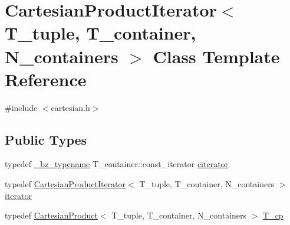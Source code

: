 \hypertarget{classCartesianProductIterator}{}\section{Cartesian\+Product\+Iterator$<$ T\+\_\+tuple, T\+\_\+container, N\+\_\+containers $>$ Class Template Reference}
\label{classCartesianProductIterator}


{\ttfamily \#include $<$cartesian.\+h$>$}

\subsection*{Public Types}
\begin{DoxyCompactItemize}
\item 
typedef \hyperlink{compiler_8h_a1bc40add3e72effc9cf69dbe445cbdfd}{\+\_\+bz\+\_\+typename} T\+\_\+container\+::const\+\_\+iterator \hyperlink{classCartesianProductIterator_a8cfe16c0d4694b851a0084e1c309c896}{citerator}
\item 
typedef \hyperlink{classCartesianProductIterator}{Cartesian\+Product\+Iterator}$<$ T\+\_\+tuple, T\+\_\+container, N\+\_\+containers $>$ \hyperlink{classCartesianProductIterator_a68eb421dce636a204a0e0b97eaf01e4b}{iterator}
\item 
typedef \hyperlink{classCartesianProduct}{Cartesian\+Product}$<$ T\+\_\+tuple, T\+\_\+container, N\+\_\+containers $>$ \hyperlink{classCartesianProductIterator_a4aca90c681d7dffbe5082c6ec9bda77e}{T\+\_\+cp}
\end{DoxyCompactItemize}
